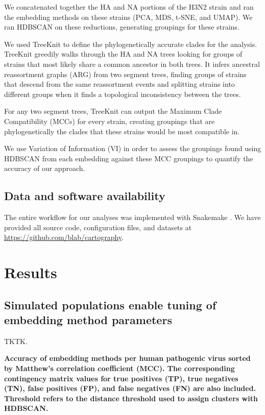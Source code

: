 \documentclass[10pt,letterpaper]{article}
\begin{document}
We concatenated together the HA and NA portions of the H3N2 strain and ran the embedding methods on these strains (PCA, MDS, t-SNE, and UMAP).
We ran HDBSCAN \cite{campello2015hierarchical} on these reductions, generating groupings for these strains.

We used TreeKnit \cite{barrat2022treeknit} to define the phylogenetically accurate clades for the analysis.
TreeKnit greedily walks through the HA and NA trees looking for groups of strains that most likely share a common ancestor in both trees.
It infers ancestral reassortment graphs (ARG) from two segment trees, finding groups of strains that descend from the same reassortment events and splitting strains into different groups when it finds a topological inconsistency between the trees.

For any two segment trees, TreeKnit can output the Maximum Clade Compatibility (MCCs) for every strain, creating groupings that are phylogenetically the clades that these strains would be most compatible in.

We use Variation of Information (VI) in order to assess the groupings found using HDBSCAN from each embedding against these MCC groupings to quantify the accuracy of our approach.

\subsection*{Data and software availability}

The entire workflow for our analyses was implemented with Snakemake \cite{molder_2021}.
We have provided all source code, configuration files, and datasets at \href{https://github.com/blab/cartography}{https://github.com/blab/cartography}.

\section*{Results}

\subsection*{Simulated populations enable tuning of embedding method parameters}

TKTK.

\begin{table}[!ht]
\begin{adjustwidth}{-2.25in}{0in} %
\centering
\caption{
{\bf Accuracy of embedding methods per human pathogenic virus sorted by Matthew's correlation coefficient (MCC). The corresponding contingency matrix values for true positives (TP), true negatives (TN), false positives (FP), and false negatives (FN) are also included. Threshold refers to the distance threshold used to assign clusters with HDBSCAN.}}

\label{table:accuracy}
\end{adjustwidth}
\end{table}
\end{document}

